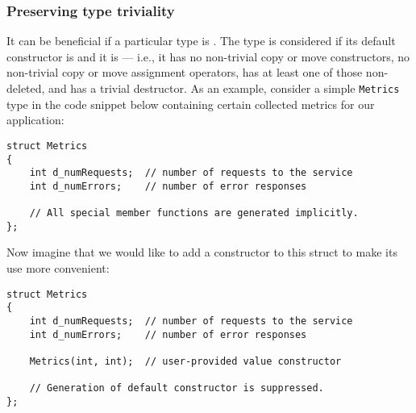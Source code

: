 %
%
%
%
%
%
%
%
%


\subsubsection{Preserving type triviality}

It can be beneficial if a particular type is .  The type is considered  if its default constructor is  and it is  --- i.e., it has no non-trivial copy or move constructors, no non-trivial copy or move assignment operators, has at least one of those non-deleted, and has a trivial destructor.  As an example, consider a simple   \lstinline!Metrics! type in the code snippet below containing certain collected metrics for our application:

\begin{lstlisting}
struct Metrics
{
    int d_numRequests;  // number of requests to the service
    int d_numErrors;    // number of error responses

    // All special member functions are generated implicitly.
};
\end{lstlisting}

\noindent Now imagine that we would like to add a constructor to this struct to make its use more convenient:

\begin{lstlisting}
struct Metrics
{
    int d_numRequests;  // number of requests to the service
    int d_numErrors;    // number of error responses

    Metrics(int, int);  // user-provided value constructor

    // Generation of default constructor is suppressed.
};
\end{lstlisting}

